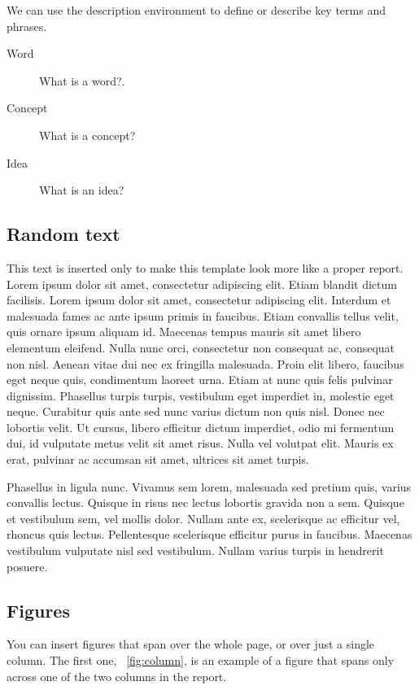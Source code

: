 \documentclass[fleqn,moreauthors,10pt]{ds_report}
\begin{document}
We can use the description environment to define or describe key terms and phrases.

\begin{description}
	\item[Word] What is a word?.
	\item[Concept] What is a concept?
	\item[Idea] What is an idea?
\end{description}


\subsection*{Random text}

This text is inserted only to make this template look more like a proper report. Lorem ipsum dolor sit amet, consectetur adipiscing elit. Etiam blandit dictum facilisis. Lorem ipsum dolor sit amet, consectetur adipiscing elit. Interdum et malesuada fames ac ante ipsum primis in faucibus. Etiam convallis tellus velit, quis ornare ipsum aliquam id. Maecenas tempus mauris sit amet libero elementum eleifend. Nulla nunc orci, consectetur non consequat ac, consequat non nisl. Aenean vitae dui nec ex fringilla malesuada. Proin elit libero, faucibus eget neque quis, condimentum laoreet urna. Etiam at nunc quis felis pulvinar dignissim. Phasellus turpis turpis, vestibulum eget imperdiet in, molestie eget neque. Curabitur quis ante sed nunc varius dictum non quis nisl. Donec nec lobortis velit. Ut cursus, libero efficitur dictum imperdiet, odio mi fermentum dui, id vulputate metus velit sit amet risus. Nulla vel volutpat elit. Mauris ex erat, pulvinar ac accumsan sit amet, ultrices sit amet turpis.

Phasellus in ligula nunc. Vivamus sem lorem, malesuada sed pretium quis, varius convallis lectus. Quisque in risus nec lectus lobortis gravida non a sem. Quisque et vestibulum sem, vel mollis dolor. Nullam ante ex, scelerisque ac efficitur vel, rhoncus quis lectus. Pellentesque scelerisque efficitur purus in faucibus. Maecenas vestibulum vulputate nisl sed vestibulum. Nullam varius turpis in hendrerit posuere.

\subsection*{Figures}

You can insert figures that span over the whole page, or over just a single column. The first one, \figurename~\ref{fig:column}, is an example of a figure that spans only across one of the two columns in the report.
\end{document}
